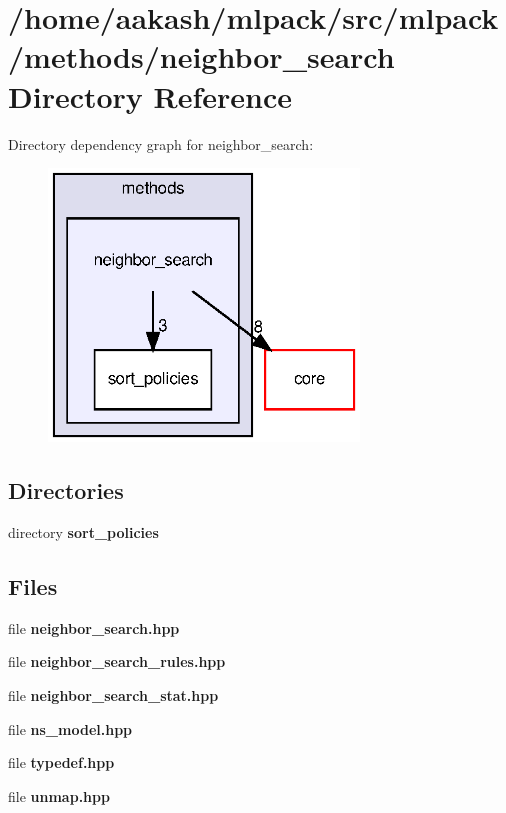 \section{/home/aakash/mlpack/src/mlpack/methods/neighbor\+\_\+search Directory Reference}
\label{dir_1d65ca8da19f261ef402f02c2090e4b8}
Directory dependency graph for neighbor\+\_\+search\+:
\nopagebreak
\begin{figure}[H]
\begin{center}
\leavevmode
\includegraphics[width=234pt]{dir_1d65ca8da19f261ef402f02c2090e4b8_dep}
\end{center}
\end{figure}
\subsection*{Directories}
\begin{DoxyCompactItemize}
\item 
directory \textbf{ sort\+\_\+policies}
\end{DoxyCompactItemize}
\subsection*{Files}
\begin{DoxyCompactItemize}
\item 
file \textbf{ neighbor\+\_\+search.\+hpp}
\item 
file \textbf{ neighbor\+\_\+search\+\_\+rules.\+hpp}
\item 
file \textbf{ neighbor\+\_\+search\+\_\+stat.\+hpp}
\item 
file \textbf{ ns\+\_\+model.\+hpp}
\item 
file \textbf{ typedef.\+hpp}
\item 
file \textbf{ unmap.\+hpp}
\end{DoxyCompactItemize}
